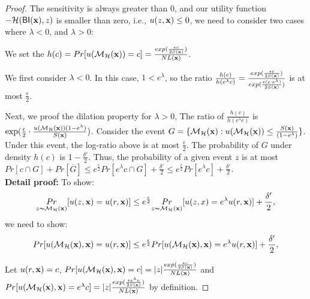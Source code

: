 \documentclass{article}
\begin{document}
\begin{proof}

The sensitivity is always greater than 0, and our utility function $-\mathcal{H}(\mathsf{BI}(\textbf{x}),z)$ is smaller than zero, i.e., $u(z,\textbf{x}) \leq 0$, we need to consider two cases where $\lambda < 0$, and $\lambda > 0$:

We set the $h(c) = Pr[u(\mathcal{M}_{\mathcal{H}}(\textbf{x})) = c] = \frac{exp(\frac{\epsilon c}{2 S(\textbf{x})})}{NL(\textbf{x})}$.

We first consider $\lambda < 0$. In this case, $1 < e ^ {\lambda}$, so the ratio $\frac{h(c)}{h(e^{\lambda}c)} = \frac{exp(\frac{\epsilon c}{2 S(\textbf{x})})}{exp(\frac{\epsilon (c \cdot e^{\lambda})}{2 S(\textbf{x})})}$ is at most $\frac{\epsilon}{2}$.

Next, we proof the dilation property for $\lambda > 0$, The ratio of $\frac{h(c)}{h(e^{\lambda}c)}$ is $\exp(\frac{\epsilon}{2} \cdot \frac{u(\mathcal{M}_{\mathcal{H}}(\textbf{x})) (1 - e^{\lambda})}{S(\textbf{x})})$. Consider the event $G = \{ \mathcal{M}_{\mathcal{H}}(\textbf{x}) : u(\mathcal{M}_{\mathcal{H}}(\textbf{x})) \leq \frac{S(\textbf{x})}{(1 - e^{\lambda})}\}$. Under this event, the log-ratio above is at most $\frac{\epsilon}{2}$. The probability of $G$ under density $h(c)$ is $1 - \frac{\delta'}{2}$. Thus, the probability of a given event $z$ is at most $Pr[c \cap G] + Pr[\overline{G}] \leq e^{\frac{\epsilon}{2}} Pr[e^{\lambda}c \cap G] + \frac{\delta'}{2} \leq e^{\frac{\epsilon}{2}} Pr[e^{\lambda}c] + \frac{\delta'}{2}$.\\


\textbf{Detail proof:}
	To show:
	\begin{equation*}
	\underset{z \thicksim \mathcal{M}_{\mathcal{H}}(\textbf{x})}{Pr}[u(z,\textbf{x}) = u(r,\textbf{x})]
	\leq
	e^{\frac{\epsilon}{2}} \underset{z \thicksim \mathcal{M}_{\mathcal{H}}(\textbf{x})}{Pr}[u(z,x) = e^{\lambda} u(r,\textbf{x})] + \frac{\delta'}{2},
	\end{equation*}
  we need to show:
  \begin{equation*}
  Pr[u(\mathcal{M}_{\mathcal{H}}(\textbf{x}), \textbf{x}) = u(r,\textbf{x})]
  \leq
  e^{\frac{\epsilon}{2}} Pr[u(\mathcal{M}_{\mathcal{H}}(\textbf{x}), \textbf{x}) = e^{\lambda} u(r,\textbf{x})] + \frac{\delta'}{2},
  \end{equation*}

	Let $u(r,\textbf{x}) = c$, $Pr[u(\mathcal{M}_{\mathcal{H}}(\textbf{x}), \textbf{x}) = c] = |z|  \frac{exp(\frac{\epsilon c}{2 S(\textbf{x})})}{NL(\textbf{x})}$ and $Pr[u(\mathcal{M}_{\mathcal{H}}(\textbf{x}), \textbf{x}) = e^{\lambda} c] = |z|  \frac{exp(\frac{\epsilon e^{\lambda} c}{2 S(\textbf{x})})}{NL(\textbf{x})}$ by definition.


\end{proof}
\end{document}
